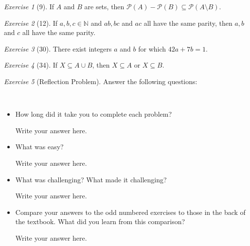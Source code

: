\documentclass[12pt]{amsart}
\makeatletter
\theoremstyle{remark}
\newtheorem*{exercise}{Exercise}%
\def\NN{\ensuremath{\mathbb N}}
\newcommand{\mc}[1]{\ensuremath{\mathcal{#1}}} %
\renewenvironment{proof}[1][\proofname]{\par\doublespacing
  \pushQED{\qed}%
  \normalfont \topsep6\p@\@plus6\p@\relax
  \list{}{%
    \settowidth{\leftmargin}{\itshape\proofname:\hskip\labelsep}%
    \setlength{\labelwidth}{0pt}%
    \setlength{\itemindent}{-\leftmargin}%
  }%
  \item[\hskip\labelsep\itshape#1\@addpunct{:}]\ignorespaces
}{%
  \popQED\endlist\@endpefalse
  \singlespacing
}
\theoremstyle{mycomment}
\makeatother
\begin{document}
\begin{exercise}[9] If $A$ and $B$ are sets, then $\mc P(A)-\mc P(B)\subseteq \mc P(A\setminus B)$.
\begin{proof}%
\end{proof}
\end{exercise}

\begin{exercise}[12] If $a,b,c\in\NN$ and $ab, bc$ and $ac$ all have the same parity, then $a,b$ and $c$ all have the same parity.
\begin{proof}%
\end{proof}
\end{exercise}

\begin{exercise}[30] There exist integers $a$ and $b$ for which $42a+7b=1$.
\begin{proof}%
\end{proof}
\end{exercise}

\begin{exercise}[34] If $X\subseteq A\cup B$, then $X\subseteq A$ or $X\subseteq B$.
\begin{proof}%
\end{proof}
\end{exercise}



\begin{exercise}[Reflection Problem]
Answer the following questions:


\begin{proof} \ 


\begin{itemize}
\item How long did it take you to complete each problem? 

Write your answer here.
\item What was easy?

Write your answer here.
\item What was challenging? What made it challenging?

Write your answer here.
\item Compare your answers to the odd numbered exercises to those in the back of the textbook. What did you learn from this comparison?

Write your answer here.
\end{itemize}\end{proof}
\end{exercise}









 
\end{document}
